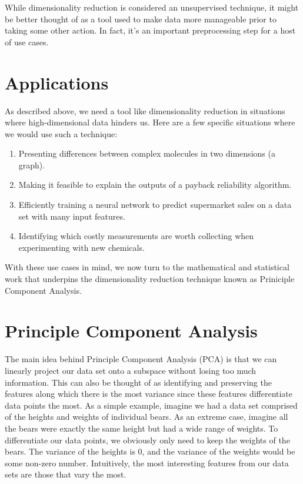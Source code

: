 While dimensionality reduction is considered an unsupervised technique, it might be better thought of as a tool used to make data more manageable prior to taking some other action. In fact, it's an important preprocessing step for a host of use cases.

\section{Applications}
As described above, we need a tool like dimensionality reduction in situations where high-dimensional data hinders us. Here are a few specific situations where we would use such a technique:

\begin{enumerate}
    \item Presenting differences between complex molecules in two dimensions (a graph).
    \item Making it feasible to explain the outputs of a payback reliability algorithm.
    \item Efficiently training a neural network to predict supermarket sales on a data set with many input features.
    \item Identifying which costly measurements are worth collecting when experimenting with new chemicals.
\end{enumerate}

With these use cases in mind, we now turn to the mathematical and statistical work that underpins the dimensionality reduction technique known as Priniciple Component Analysis.

\section{Principle Component Analysis}
The main idea behind Principle Component Analysis (PCA) is that we can linearly project our data set onto a subspace without losing too much information. This can also be thought of as identifying and preserving the features along which there is the most variance since these features differentiate data points the most. As a simple example, imagine we had a data set comprised of the heights and weights of individual bears. As an extreme case, imagine all the bears were exactly the same height but had a wide range of weights. To differentiate our data points, we obviously only need to keep the weights of the bears. The variance of the heights is 0, and the variance of the weights would be some non-zero number. Intuitively, the most interesting features from our data sets are those that vary the most.

